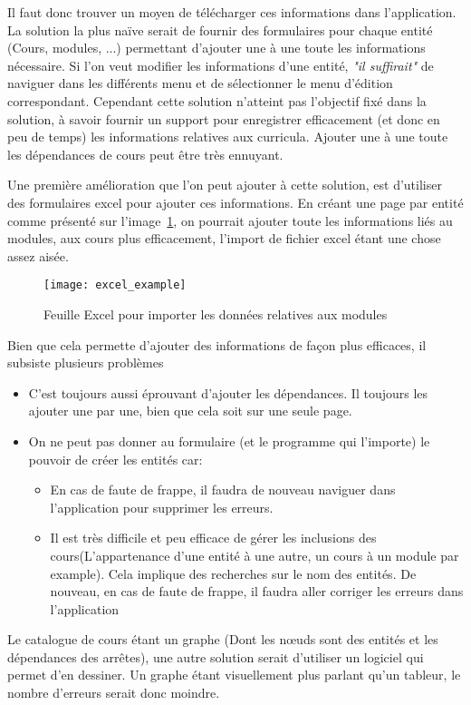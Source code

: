 Il faut donc trouver un moyen de télécharger ces informations dans l'application. La solution la plus naïve serait de fournir des formulaires pour chaque entité (Cours, modules, ...) permettant d'ajouter une à une toute les informations nécessaire. Si l'on veut modifier les informations d'une entité, \textit{"il suffirait"} de naviguer dans les différents menu et de sélectionner le menu d'édition correspondant. Cependant cette solution n'atteint pas l'objectif fixé dans la solution, à savoir fournir un support pour enregistrer efficacement (et donc en peu de temps) les informations relatives aux curricula. Ajouter une à une toute les dépendances de cours peut être très ennuyant. 

Une première amélioration que l'on peut ajouter à cette solution, est d'utiliser des formulaires excel pour ajouter ces informations. En créant une page par entité comme présenté sur l'image~\ref{fig:excel_example}, on pourrait ajouter toute les informations liés au modules, aux cours plus efficacement, l'import de fichier excel étant une chose assez aisée. 
\begin{figure}[H]
\centering
\caption{Feuille Excel pour importer les données relatives aux modules}
\label{fig:excel_example}
\texttt{[image: excel\_example]}
\end{figure} 

Bien que cela permette d'ajouter des informations de façon plus efficaces, il subsiste plusieurs problèmes
\begin{itemize}
\item C'est toujours aussi éprouvant d'ajouter les dépendances. Il toujours les ajouter une par une, bien que cela soit sur une seule page.
\item On ne peut pas donner au formulaire (et le programme qui l'importe) le pouvoir de créer les entités car:
\begin{itemize}
	\item En cas de faute de frappe, il faudra de nouveau naviguer dans l'application pour supprimer les erreurs.
	\item Il est très difficile et peu efficace de gérer les inclusions des cours(L'appartenance d'une entité à une autre, un cours à un module par example). Cela implique des recherches sur le nom des entités. De nouveau, en cas de faute de frappe, il faudra aller corriger les erreurs dans l'application
\end{itemize}
\end{itemize}

Le catalogue de cours étant un graphe (Dont les nœuds sont des entités et les dépendances des arrêtes), une autre solution serait d'utiliser un logiciel qui permet d'en dessiner. Un graphe étant visuellement plus parlant  qu'un tableur, le nombre d'erreurs serait donc moindre. 

